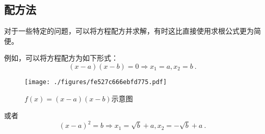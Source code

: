 \subsection{配方法}
对于一些特定的问题，可以将方程配方并求解，有时这比直接使用求根公式更为简便。

例如，可以将方程配方为如下形式：
$$(x-a)(x-b)=0\Rightarrow x_1=a, x_2=b~.$$
\begin{figure}[ht]
\centering
\texttt{[image: ./figures/fe527c666ebfd775.pdf]}
\caption{$f(x)=(x-a)(x-b)$示意图} \label{fig_quasol_2}
\end{figure}
或者
$$(x-a)^2=b\Rightarrow x_1=\sqrt{b}+a, x_2=-\sqrt{b}+a~.$$
